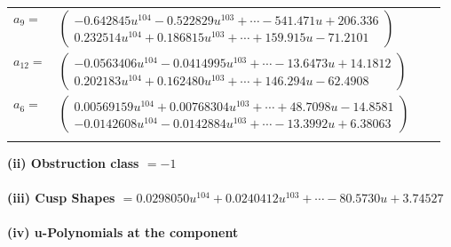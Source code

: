 \documentclass[1p]{elsarticle_modified}
\theoremstyle{definition}
\begin{document}
\begin{tabular}{m{7pt} m{180pt} m{7pt} m{180pt} }
\flushright $a_{9}=$&$\begin{pmatrix}-0.642845 u^{104}-0.522829 u^{103}+\cdots-541.471 u+206.336\\0.232514 u^{104}+0.186815 u^{103}+\cdots+159.915 u-71.2101\end{pmatrix}$ \\
\flushright $a_{12}=$&$\begin{pmatrix}-0.0563406 u^{104}-0.0414995 u^{103}+\cdots-13.6473 u+14.1812\\0.202183 u^{104}+0.162480 u^{103}+\cdots+146.294 u-62.4908\end{pmatrix}$ \\
\flushright $a_{6}=$&$\begin{pmatrix}0.00569159 u^{104}+0.00768304 u^{103}+\cdots+48.7098 u-14.8581\\-0.0142608 u^{104}-0.0142884 u^{103}+\cdots-13.3992 u+6.38063\end{pmatrix}$\\&\end{tabular}
\flushleft \textbf{(ii) Obstruction class $= -1$}\\~\\
\flushleft \textbf{(iii) Cusp Shapes $= 0.0298050 u^{104}+0.0240412 u^{103}+\cdots-80.5730 u+3.74527$}\\~\\
\newpage\renewcommand{\arraystretch}{1}
\flushleft \textbf{(iv) u-Polynomials at the component}\newline \\
\end{document}
